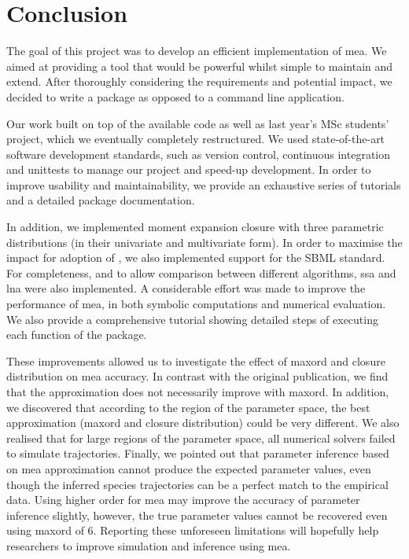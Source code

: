 \section{Conclusion} \label{sec:conclus}

The goal of this project was to develop an efficient \py{} implementation of \acrlong{mea}.
We aimed at providing a tool that would be powerful whilst simple to maintain and extend.
After thoroughly considering the requirements and potential impact, we decided to write a \py{} package as opposed to a command line application.

Our work built on top of the available \mat{} code as well as last year's MSc students' project, which we eventually completely restructured.
We used state-of-the-art software development standards, such as version control, continuous integration and unittests to manage our project and speed-up development.
In order to improve usability and maintainability, we provide an exhaustive series of tutorials and a detailed package documentation.

In addition, we implemented moment expansion closure with three parametric distributions (in their univariate and multivariate form).
In order to maximise the impact for adoption of \means, we also implemented support for the SBML standard.
For completeness, and to allow comparison between different algorithms, \gls{ssa} and \gls{lna} were also implemented.
A considerable effort was made to improve the performance of \gls{mea},  in both symbolic computations and numerical evaluation.
We also provide a comprehensive tutorial showing detailed steps of executing each function of the package.

These improvements allowed us to investigate the effect of \gls{maxord} and closure distribution on \gls{mea} accuracy.
In contrast with the original publication, we find that the approximation does not necessarily improve with \gls{maxord}.
In addition, we discovered that according to the region of the parameter space, the best approximation (\gls{maxord} and closure distribution) could be very different.
We also realised that for large regions of the parameter space, all numerical solvers failed to simulate trajectories.
Finally, we pointed out that parameter inference based on \gls{mea} approximation cannot produce the expected parameter values, even though the inferred species trajectories can be a perfect match to the empirical data. Using higher order for \gls{mea} may improve the accuracy of parameter inference slightly, however, the true parameter values cannot be recovered even using \gls{maxord} of 6.
Reporting these unforeseen limitations will hopefully help researchers to improve simulation and inference using \gls{mea}.

